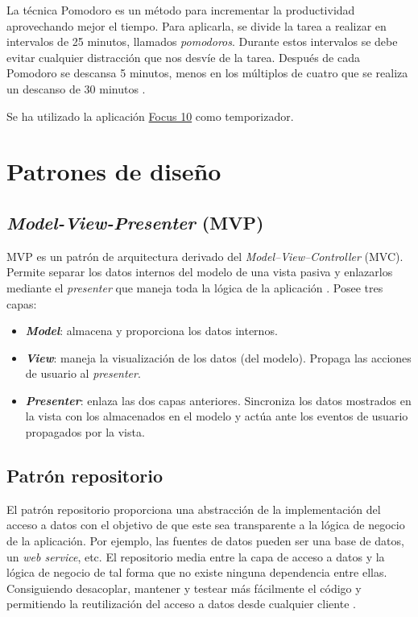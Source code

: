 La técnica Pomodoro es un método para incrementar la productividad aprovechando 
mejor el tiempo. Para aplicarla, se divide la tarea a realizar en intervalos de
25 minutos, llamados \emph{pomodoros}. Durante estos intervalos se debe evitar cualquier 
distracción que nos desvíe de la tarea. Después de cada Pomodoro se descansa 5 
minutos, menos en los múltiplos de cuatro que se realiza un descanso de 30 minutos
\citep{wiki:pomodoro}.

Se ha utilizado la aplicación \href{https://www.microsoft.com/es-es/store/p/focus-10/9nblggh5g2xh}{Focus 10} como temporizador.

\section{Patrones de diseño}\label{patrones-de-diseno}

\subsection{\emph{Model-View-Presenter} (MVP)}\label{model-view-presenter-mvp}

MVP es un patrón de arquitectura derivado del
\emph{Model--View--Controller} (MVC). Permite separar los datos internos
del modelo de una vista pasiva y enlazarlos mediante el \emph{presenter}
que maneja toda la lógica de la aplicación \citep{pattern:mvp}. 
Posee tres capas:

\begin{itemize}
\tightlist
\item
  \textit{\textbf{Model}}: almacena y proporciona los datos internos.
\item
  \textit{\textbf{View}}: maneja la visualización de los datos (del modelo).
  Propaga las acciones de usuario al \emph{presenter}.
\item
  \textit{\textbf{Presenter}}: enlaza las dos capas anteriores. Sincroniza los
  datos mostrados en la vista con los almacenados en el modelo y actúa
  ante los eventos de usuario propagados por la vista.
\end{itemize}


\subsection{Patrón repositorio}\label{patron-repositorio}

El patrón repositorio proporciona una abstracción de la implementación
del acceso a datos con el objetivo de que este sea transparente a la
lógica de negocio de la aplicación. Por ejemplo, las fuentes de datos
pueden ser una base de datos, un \emph{web service}, etc. El repositorio
media entre la capa de acceso a datos y la lógica de negocio de tal
forma que no existe ninguna dependencia entre ellas. Consiguiendo
desacoplar, mantener y testear más fácilmente el código y permitiendo la
reutilización del acceso a datos desde cualquier cliente \citep{pattern:repository}.

